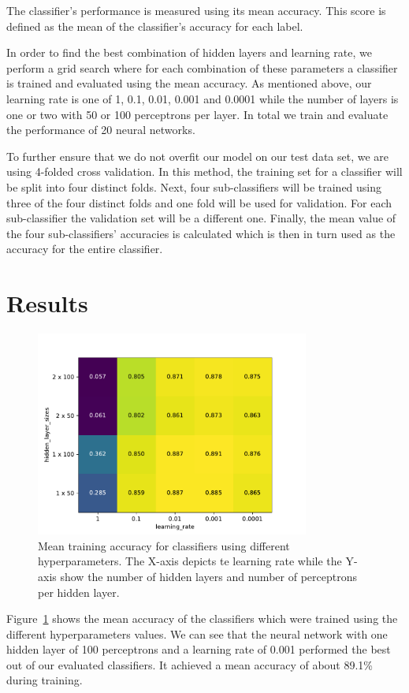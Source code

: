 \documentclass[sigconf]{acmart}
\begin{document}
The classifier's performance is measured using its mean accuracy. This score is defined as the mean of the classifier's accuracy for each label.

In order to find the best combination of hidden layers and learning rate, we perform a grid search where for each combination of these parameters a classifier is trained and evaluated using the mean accuracy. As mentioned above, our learning rate is one of 1, 0.1, 0.01, 0.001 and 0.0001 while the number of layers is one or two with 50 or 100 perceptrons per layer. In total we train and evaluate the performance of 20 neural networks.

To further ensure that we do not overfit our model on our test data set, we are using 4-folded cross validation. In this method, the training set for a classifier will be split into four distinct folds. Next, four sub-classifiers will be trained using three of the four distinct folds and one fold will be used for validation. For each sub-classifier the validation set will be a different one. Finally, the mean value of the four sub-classifiers' accuracies is calculated which is then in turn used as the accuracy for the entire classifier\cite{introduction_ml}.

\section{Results}

\begin{figure}
	\centering
	\includegraphics[width=9cm]{fig2.pdf}
	\caption{Mean training accuracy for classifiers using different hyperparameters. The X-axis depicts te learning rate while the Y-axis show the number of hidden layers and number of perceptrons per hidden layer.}
	\label{fig:heatmap}
\end{figure}


Figure~\ref{fig:heatmap} shows the mean accuracy of the classifiers which were trained using the different hyperparameters values. We can see that the neural network with one hidden layer of 100 perceptrons and a learning rate of 0.001 performed the best out of our evaluated classifiers. It achieved a mean accuracy of about 89.1\% during training. 
\end{document}
